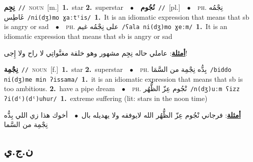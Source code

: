 \documentclass[10pt,a4paper,twoside]{article} %
\begin{document}
\begin{multicols}{2}
{\setlength\topsep{0pt}\textbf{\foreignlanguage{arabic}{نِجِم}}\ {\color{gray}\texttt{//}\color{black}}\ \textsc{noun}\ [m.]\ \textbf{1.}~star  \textbf{2.}~superstar\ \ $\bullet$\ \ \setlength\topsep{0pt}\textbf{\foreignlanguage{arabic}{نُجُوم}}\ {\color{gray}\texttt{//}\color{black}}\ [pl.]\ \ $\bullet$\ \ \textsc{ph.} \color{gray} \foreignlanguage{arabic}{نِجْمُه غَاطِس}\color{black}\ {\color{gray}\texttt{/{\sffamily ni(dʒ)mo ɣaːtˤis}/}\color{black}}\ \textbf{1.}~It is an idiomatic expression that means that sb is angry or sad\ \ $\bullet$\ \ \textsc{ph.} \color{gray} \foreignlanguage{arabic}{على نِجْمُه غيم}\color{black}\ {\color{gray}\texttt{/{\sffamily ʕala ni(dʒ)mo ɣeːm}/}\color{black}}\ \textbf{1.}~It is an idiomatic expression that means that sb is angry or sad\  \begin{flushright}\color{gray}\foreignlanguage{arabic}{\textbf{\underline{\foreignlanguage{arabic}{أمثلة}}}: عاملي حاله نِجِم مشهور وهو خلقة مغنَّواتِي لا راح ولا إِجى!}\end{flushright}\color{black}} \vspace{2mm}

{\setlength\topsep{0pt}\textbf{\foreignlanguage{arabic}{نِجْمِة}}\ {\color{gray}\texttt{//}\color{black}}\ \textsc{noun}\ [f.]\ \textbf{1.}~star  \textbf{2.}~superstar\ \ $\bullet$\ \ \textsc{ph.} \color{gray} \foreignlanguage{arabic}{بِدُّه نِجْمِة من السَّمَا}\color{black}\ {\color{gray}\texttt{/{\sffamily biddo ni(dʒ)me min ʔissama}/}\color{black}}\ \textbf{1.}~it is an idiomatic expression that means that sb is too ambitious.  \textbf{2.}~have a pipe dream\ \ $\bullet$\ \ \textsc{ph.} \color{gray} \foreignlanguage{arabic}{نْجُوم عِزّ الظُّهُر}\color{black}\ {\color{gray}\texttt{/{\sffamily n(dʒ)uːm ʕizz ʔi(dˤ)(dˤ)uhur}/}\color{black}}\ \textbf{1.}~extreme suffering (lit: stars in the noon time)\  \begin{flushright}\color{gray}\foreignlanguage{arabic}{\textbf{\underline{\foreignlanguage{arabic}{أمثلة}}}: فرجاني نْجُوم عِزّ الظُّهُر الله لايوفقه ولا يهديله بال\ $\bullet$\ \  أخوك هذا زي اللي بِدُّه نِجْمِة من السَّما}\end{flushright}\color{black}} \vspace{2mm}

\vspace{-3mm}
\subsection*{\color{blue}\foreignlanguage{arabic}{ن.ج.ي}\color{blue}{}} 


\end{multicols}
\end{document}
